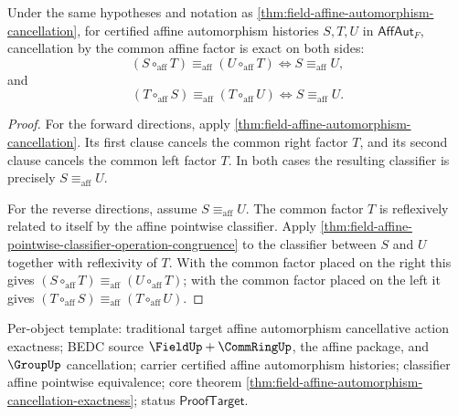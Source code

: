 \begin{theorem}
\label{thm:field-affine-automorphism-cancellation-exactness}
Under the same hypotheses and notation as
\autoref{thm:field-affine-automorphism-cancellation}, for certified affine
automorphism histories $S,T,U$ in $\mathsf{AffAut}_F$, cancellation by the
common affine factor is exact on both sides:
$$
(S\circ_{\mathrm{aff}}T)\equiv_{\mathrm{aff}}(U\circ_{\mathrm{aff}}T)
\Longleftrightarrow S\equiv_{\mathrm{aff}}U,
$$
and
$$
(T\circ_{\mathrm{aff}}S)\equiv_{\mathrm{aff}}(T\circ_{\mathrm{aff}}U)
\Longleftrightarrow S\equiv_{\mathrm{aff}}U.
$$
\end{theorem}
\begin{proof}
For the forward directions, apply
\autoref{thm:field-affine-automorphism-cancellation}. Its first clause cancels
the common right factor $T$, and its second clause cancels the common left
factor $T$. In both cases the resulting classifier is precisely
$S\equiv_{\mathrm{aff}}U$.

For the reverse directions, assume $S\equiv_{\mathrm{aff}}U$. The common
factor $T$ is reflexively related to itself by the affine pointwise classifier.
Apply
\autoref{thm:field-affine-pointwise-classifier-operation-congruence} to the
classifier between $S$ and $U$ together with reflexivity of $T$. With the common
factor placed on the right this gives
$(S\circ_{\mathrm{aff}}T)\equiv_{\mathrm{aff}}(U\circ_{\mathrm{aff}}T)$; with
the common factor placed on the left it gives
$(T\circ_{\mathrm{aff}}S)\equiv_{\mathrm{aff}}(T\circ_{\mathrm{aff}}U)$.
\end{proof}

Per-object template: traditional target affine automorphism cancellative action
exactness; BEDC source $\FieldUp+\CommRingUp$, the affine package, and
$\GroupUp$ cancellation; carrier certified affine automorphism histories;
classifier affine pointwise equivalence; core theorem
\autoref{thm:field-affine-automorphism-cancellation-exactness}; status
$\mathsf{ProofTarget}$.
